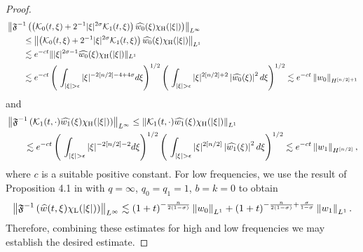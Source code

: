 \documentclass[11pt,reqno]{amsart}
\newcommand{\tron}[1]{\left( #1 \right)}
\numberwithin{equation}{section}
\theoremstyle{plain}
\begin{document}
\begin{proof}
\begin{align*}
&\left\|\mathfrak{F}^{-1}\tron{\tron{\mathcal{K}_0(t,\xi)+2^{-1}|\xi|^{2\sigma}\mathcal{K}_1(t,\xi)}\widehat{w_0}(\xi)\chi_{\rm H}(|\xi|)}\right\|_{L^{\infty}}\\
&\qquad \leq \left\|\tron{\mathcal{K}_0(t,\xi)+2^{-1}|\xi|^{2\sigma}\mathcal{K}_1(t,\xi)}\widehat{w_0}(\xi)\chi_{\rm H}(|\xi|)\right\|_{L^{1}}\\
&\qquad \lesssim e^{-ct}\||\xi|^{2\sigma-1}\widehat{w_0}(\xi)\chi_{\rm H}(|\xi|)\|_{L^1}\\
&\qquad \lesssim e^{-ct}\tron{\,\,\int_{|\xi|>\epsilon}|\xi|^{-2[n/2]-4+4\sigma}d\xi}^{1/2}\tron{\,\,\int_{|\xi|>\epsilon}|\xi|^{2[n/2]+2}\left|\widehat{w_0}(\xi)\right|^2d\xi}^{1/2} \lesssim e^{-ct}\left\|w_0\right\|_{H^{[n/2]+1}}
\end{align*}
and 
\begin{align*}
&\left\|\mathfrak{F}^{-1}\tron{\mathcal{K}_1(t,\cdot)\widehat{w_1}(\xi)\chi_{\rm H}(|\xi|)}\right\|_{L^{\infty}}\leq \left\|\mathcal{K}_1(t,\cdot)\widehat{w_1}(\xi)\chi_{\rm H}(|\xi|)\right\|_{L^{1}}\\
&\qquad \lesssim e^{-ct}\tron{\,\,\int_{|\xi|>\epsilon}|\xi|^{-2[n/2]-2}d\xi}^{1/2}\tron{\,\,\int_{|\xi|>\epsilon}|\xi|^{2[n/2]}\left|\widehat{w_1}(\xi)\right|^2d\xi}^{1/2} \lesssim e^{-ct}\left\|w_1\right\|_{H^{[n/2]}},
\end{align*}
where $c$ is a suitable positive constant. For low frequencies, we use the result of Proposition 4.1 in \cite{D'Abbicco2017} with $q=\infty$, $q_0=q_1=1$, $b=k=0$ to obtain
\begin{align*}
\left\|\mathfrak{F}^{-1}\tron{\widehat{w}(t,\xi)\chi_{\rm L}(|\xi|)}\right\|_{L^{\infty}}\lesssim (1+t)^{-\frac{n}{2(1-\sigma)}}\left\|w_0\right\|_{L^1}+(1+t)^{-\frac{n}{2(1-\sigma)}+\frac{\sigma}{1-\sigma}}\left\|w_1\right\|_{L^1}.
\end{align*}
Therefore, combining these estimates for high and low frequencies we may establish the desired estimate.
\end{proof}
\end{document}
